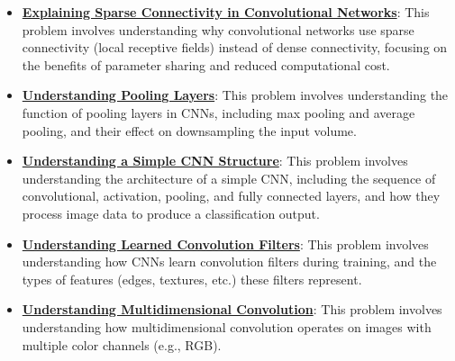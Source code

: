\documentclass{article}%
\begin{document}
\begin{itemize}[leftmargin=*]
\item \href{https://purdue.brightspace.com/d2l/common/assets/pdfjs-d2l-dist/1.0.14-legacy/web/viewer.html?file=\%2Fcontent\%2Fenforced\%2F1095467-wl.202510.CS.24300.001\%2F09L1-cnn.pdf\%3Fou\%3D1095467\&lang=en-us\&container=d2l-fileviewer-rendered-pdf\&fullscreen=d2l-fileviewer-rendered-pdf-dialog\&height=667#page=10}{\textbf{Explaining Sparse Connectivity in Convolutional Networks}}: This problem involves understanding why convolutional networks use sparse connectivity (local receptive fields) instead of dense connectivity, focusing on the benefits of parameter sharing and reduced computational cost.%
\item \href{https://purdue.brightspace.com/d2l/common/assets/pdfjs-d2l-dist/1.0.14-legacy/web/viewer.html?file=\%2Fcontent\%2Fenforced\%2F1095467-wl.202510.CS.24300.001\%2F09L1-cnn.pdf\%3Fou\%3D1095467\&lang=en-us\&container=d2l-fileviewer-rendered-pdf\&fullscreen=d2l-fileviewer-rendered-pdf-dialog\&height=667#page=14}{\textbf{Understanding Pooling Layers}}: This problem involves understanding the function of pooling layers in CNNs, including max pooling and average pooling, and their effect on downsampling the input volume.%
\item \href{https://purdue.brightspace.com/d2l/common/assets/pdfjs-d2l-dist/1.0.14-legacy/web/viewer.html?file=\%2Fcontent\%2Fenforced\%2F1095467-wl.202510.CS.24300.001\%2F09L1-cnn.pdf\%3Fou\%3D1095467\&lang=en-us\&container=d2l-fileviewer-rendered-pdf\&fullscreen=d2l-fileviewer-rendered-pdf-dialog\&height=667#page=17}{\textbf{Understanding a Simple CNN Structure}}: This problem involves understanding the architecture of a simple CNN, including the sequence of convolutional, activation, pooling, and fully connected layers, and how they process image data to produce a classification output.%
\item \href{https://purdue.brightspace.com/d2l/common/assets/pdfjs-d2l-dist/1.0.14-legacy/web/viewer.html?file=\%2Fcontent\%2Fenforced\%2F1095467-wl.202510.CS.24300.001\%2F09L1-cnn.pdf\%3Fou\%3D1095467\&lang=en-us\&container=d2l-fileviewer-rendered-pdf\&fullscreen=d2l-fileviewer-rendered-pdf-dialog\&height=667#page=18}{\textbf{Understanding Learned Convolution Filters}}: This problem involves understanding how CNNs learn convolution filters during training, and the types of features (edges, textures, etc.) these filters represent.%
\item \href{https://purdue.brightspace.com/d2l/common/assets/pdfjs-d2l-dist/1.0.14-legacy/web/viewer.html?file=\%2Fcontent\%2Fenforced\%2F1095467-wl.202510.CS.24300.001\%2F09L1-cnn.pdf\%3Fou\%3D1095467\&lang=en-us\&container=d2l-fileviewer-rendered-pdf\&fullscreen=d2l-fileviewer-rendered-pdf-dialog\&height=667#page=19}{\textbf{Understanding Multidimensional Convolution}}: This problem involves understanding how multidimensional convolution operates on images with multiple color channels (e.g., RGB).%

\end{itemize}
\end{document}
